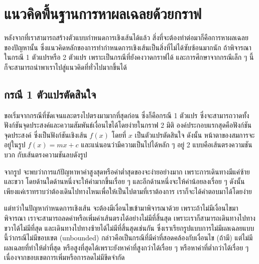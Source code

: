 \section{แนวคิดพื้นฐานการหาผลเฉลยด้วยกราฟ}
หลังจากที่เราสามารถสร้างตัวแบบกำหนดการเชิงเส้นได้แล้ว สิ่งที่จะต้องทำต่อมาก็คือการหาผลเฉลยของปัญหานั้น
ซึ่งแนวคิดหลักของการทำกำหนดการเชิงเส้นเป็นสิ่งที่ไม่ได้ซับซ้อนมากนัก ถ้าพิจารณาในกรณี 1 ตัวแปรหรือ 2 ตัวแปร เพราะเป็นกรณีที่ยังคงวาดกราฟได้ และการศึกษาจากกรณีเล็ก ๆ นี้ก็จะสามารถนำพาเราไปสู่แนวคิดที่ทั่วไปมากขึ้นได้

\subsection{กรณี 1 ตัวแปรตัดสินใจ}
ขอเริ่มจากกรณีที่ชัดเจนและตรงไปตรงมามากที่สุดก่อน ซึ่งก็คือกรณี 1 ตัวแปร ซึ่งจะสามารถวาดทั้งฟังก์ชันจุดประสงค์และความสัมพันธ์เงื่อนไขได้โดยง่ายในกราฟ 2 มิติ
องค์ประกอบแรกสุดคือฟังก์ชันจุดประสงค์ ซึ่งเป็นฟังก์ชันเชิงเส้น $f(x)$ โดยที่ $x$ เป็นตัวแปรตัดสินใจ ดังนั้น หน้าตาของสมการจะอยู่ในรูป $f(x) = mx + c$ และแน่นอนว่ามีความเป็นไปได้หลัก ๆ อยู่ 2 แบบคือเส้นตรงความชันบวก กับเส้นตรงความชันลบดังรูป

\begin{center}
\end{center}
จากรูป จะพบว่าการแก้ปัญหาหาค่าสูงสุดหรือค่าต่ำสุดของจะง่ายอย่างมาก เพราะการเดินทางมีแค่ซ้ายและขวา โดยด้านใดด้านหนึ่งจะให้ค่ามากขึ้นเรื่อย ๆ และอีกด้านหนึ่งจะให้ค่าน้อยลงเรื่อย ๆ
ดังนั้น เพียงแค่เราทราบว่าต้องเดินไปทางไหนเพื่อให้เป็นไปตามที่เราต้องการ เราก็จะได้คำตอบมาได้โดยง่าย

แต่ทว่าในปัญหากำหนดการเชิงเส้น จะต้องมีเงื่อนไขเข้ามาพิจารณาด้วย เพราะถ้าไม่มีเงื่อนไขมาพิจารณา เราจะสามารถลดค่าหรือเพิ่มค่าเส้นตรงได้อย่างไม่มีที่สิ้นสุด เพราะเราก็สามารถเดินทางไปทางขวาได้ไม่มีที่สุด และเดินทางไปทางซ้ายได้ไม่มีที่สิ้นสุดเช่นกัน ซึ่งเราเรียกรูปแบบการไม่มีผลเฉลยแบบนี้ว่ากรณีไม่มีขอบเขต (unbounded) กล่าวคือเป็นกรณีที่มีค่าที่สอดคล้องกับเงื่อนไข (ถ้ามี) แต่ไม่มีผลเฉลยที่ทำให้ต่ำที่สุด หรือสูงที่สุดได้เพราะยังหาค่าที่สูงกว่าได้เรื่อย ๆ หรือหาค่าที่ต่ำกว่าได้เรื่อย ๆ เนื่องจากขอบเขตการเพิ่มหรือการลดไม่มีขีดจำกัด

